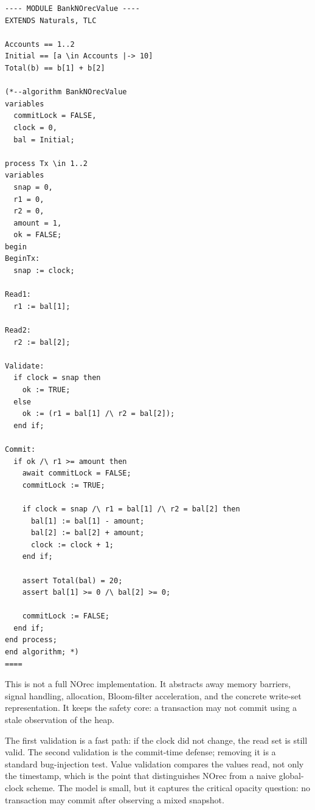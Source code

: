\begin{lstlisting}[caption={A finite PlusCal model of NOrec-style value validation.}]
---- MODULE BankNOrecValue ----
EXTENDS Naturals, TLC

Accounts == 1..2
Initial == [a \in Accounts |-> 10]
Total(b) == b[1] + b[2]

(*--algorithm BankNOrecValue
variables
  commitLock = FALSE,
  clock = 0,
  bal = Initial;

process Tx \in 1..2
variables
  snap = 0,
  r1 = 0,
  r2 = 0,
  amount = 1,
  ok = FALSE;
begin
BeginTx:
  snap := clock;

Read1:
  r1 := bal[1];

Read2:
  r2 := bal[2];

Validate:
  if clock = snap then
    ok := TRUE;
  else
    ok := (r1 = bal[1] /\ r2 = bal[2]);
  end if;

Commit:
  if ok /\ r1 >= amount then
    await commitLock = FALSE;
    commitLock := TRUE;

    if clock = snap /\ r1 = bal[1] /\ r2 = bal[2] then
      bal[1] := bal[1] - amount;
      bal[2] := bal[2] + amount;
      clock := clock + 1;
    end if;

    assert Total(bal) = 20;
    assert bal[1] >= 0 /\ bal[2] >= 0;

    commitLock := FALSE;
  end if;
end process;
end algorithm; *)
====
\end{lstlisting}

This is not a full NOrec implementation.  It abstracts away memory barriers,
signal handling, allocation, Bloom-filter acceleration, and the concrete
write-set representation.  It keeps the safety core: a transaction may not
commit using a stale observation of the heap.

The first validation is a fast path: if the clock did not change, the read set
is still valid.  The second validation is the commit-time defense; removing it
is a standard bug-injection test.  Value validation compares the values read,
not only the timestamp, which is the point that distinguishes NOrec from a naive
global-clock scheme.  The model is small, but it captures the critical opacity
question: no transaction may commit after observing a mixed snapshot.


